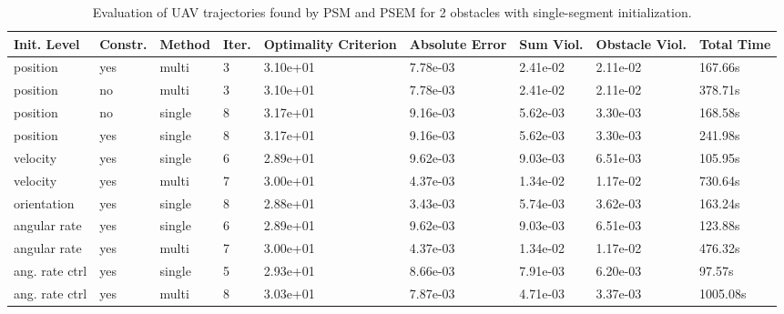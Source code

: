 \begin{table}
\small

\caption{Evaluation of UAV trajectories found by PSM and PSEM for 2 obstacles with single-segment initialization.}
\label{tab:traj-plan-eval-simple2-single}
\begin{tabular}{p{21mm}p{9mm}p{12mm}p{6mm}p{14mm}p{14mm}p{14mm}p{14mm}p{14mm}}
\toprule
Init. Level & Constr. & Method & Iter. & Optimality Criterion & Absolute Error & Sum Viol. & Obstacle Viol. & Total Time \\
\midrule
position & yes & multi & \cellcolor{color3} 3 & 3.10e+01 & 7.78e-03 & \cellcolor{color8} 2.41e-02 & \cellcolor{color8} 2.11e-02 & 167.66s \\
position & no & multi & \cellcolor{color3} 3 & 3.10e+01 & 7.78e-03 & \cellcolor{color8} 2.41e-02 & \cellcolor{color8} 2.11e-02 & 378.71s \\
position & no & single & \cellcolor{color8} 8 & \cellcolor{color8} 3.17e+01 & 9.16e-03 & \cellcolor{color10} 5.62e-03 & \cellcolor{color3} 3.30e-03 & 168.58s \\
position & yes & single & \cellcolor{color8} 8 & \cellcolor{color8} 3.17e+01 & 9.16e-03 & \cellcolor{color10} 5.62e-03 & \cellcolor{color3} 3.30e-03 & 241.98s \\
velocity & yes & single & 6 & \cellcolor{color10} 2.89e+01 & \cellcolor{color8} 9.62e-03 & 9.03e-03 & 6.51e-03 & \cellcolor{color10} 105.95s \\
velocity & yes & multi & 7 & 3.00e+01 & \cellcolor{color10} 4.37e-03 & 1.34e-02 & 1.17e-02 & \cellcolor{color9} 730.64s \\
orientation & yes & single & \cellcolor{color8} 8 & \cellcolor{color3} 2.88e+01 & \cellcolor{color3} 3.43e-03 & 5.74e-03 & 3.62e-03 & 163.24s \\
angular rate & yes & single & 6 & \cellcolor{color10} 2.89e+01 & \cellcolor{color8} 9.62e-03 & 9.03e-03 & 6.51e-03 & 123.88s \\
angular rate & yes & multi & 7 & 3.00e+01 & \cellcolor{color10} 4.37e-03 & 1.34e-02 & 1.17e-02 & 476.32s \\
ang. rate ctrl & yes & single & 5 & 2.93e+01 & 8.66e-03 & 7.91e-03 & 6.20e-03 & \cellcolor{color3} 97.57s \\
ang. rate ctrl & yes & multi & \cellcolor{color8} 8 & 3.03e+01 & 7.87e-03 & \cellcolor{color3} 4.71e-03 & 3.37e-03 & \cellcolor{color8} 1005.08s \\
\bottomrule
\end{tabular}
\end{table}
